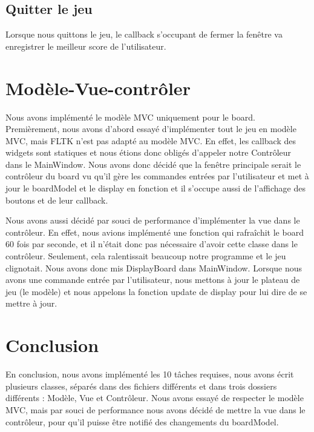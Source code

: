 \documentclass[utf8]{article}
\begin{document}
\begin{large}
\subsection{Quitter le jeu}
\indent
\par
Lorsque nous quittons le jeu, le callback s'occupant de fermer la fenêtre va
enregistrer le meilleur score de l'utilisateur.
\par

\section{Modèle-Vue-contrôler}
\indent
\par
Nous avons implémenté le modèle MVC uniquement pour le board. Premièrement, nous
avons d'abord essayé d'implémenter tout le jeu en modèle MVC, mais FLTK n'est
pas adapté au modèle MVC. En effet, les callback des widgets sont statiques et
nous étions donc obligés d'appeler notre Contrôleur dans le MainWindow. Nous
avons donc décidé que la fenêtre principale serait le contrôleur du board vu
qu'il gère les commandes entrées par l'utilisateur et met à jour le boardModel
et le display en fonction et il s'occupe aussi de l'affichage des boutons et de
leur callback.
\par
Nous avons aussi décidé par souci de performance d'implémenter la vue dans le
contrôleur. En effet, nous avions implémenté une fonction qui rafraîchit le
board 60 fois par seconde, et il n'était donc pas nécessaire d'avoir cette
classe dans le contrôleur. Seulement, cela ralentissait beaucoup notre programme
et le jeu clignotait. Nous avons donc mis DisplayBoard dans MainWindow. Lorsque
nous avons une commande entrée par l'utilisateur, nous mettons à jour le plateau
de jeu (le modèle) et nous appelons la fonction update de display pour
lui dire de se mettre à jour. 
\par
\section{Conclusion}
\indent
\par
En conclusion, nous avons implémenté les 10 tâches requises, nous avons écrit
plusieurs classes, séparés dans des fichiers différents et dans trois dossiers
différents : Modèle, Vue et Contrôleur. Nous avons essayé de respecter le modèle
MVC, mais par souci de performance nous avons décidé de mettre la vue dans le
contrôleur, pour qu'il puisse être notifié des changements du boardModel.
\par

\end{large}
\end{document}

